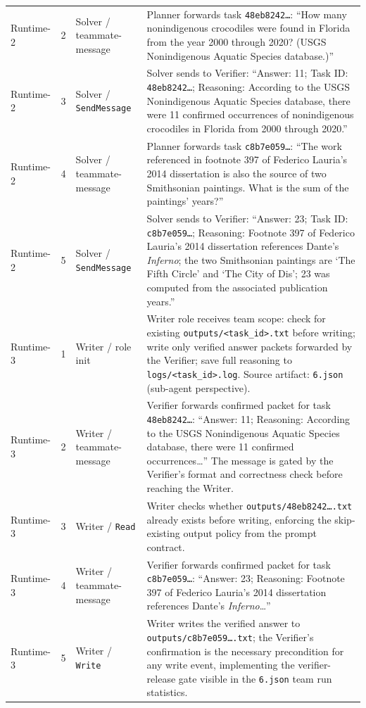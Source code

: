 \begin{table}[t]
\begin{tabular}{>{\raggedright\arraybackslash}p{}p{}p{}p{}}
        \mbox{Runtime-2} & 2 & Solver / teammate-message & Planner forwards task \texttt{48eb8242\ldots}: ``How many nonindigenous crocodiles were found in Florida from the year 2000 through 2020? (USGS Nonindigenous Aquatic Species database.)'' \\
        \mbox{Runtime-2} & 3 & Solver / \texttt{SendMessage} & Solver sends to Verifier: ``Answer: 11; Task ID: \texttt{48eb8242\ldots}; Reasoning: According to the USGS Nonindigenous Aquatic Species database, there were 11 confirmed occurrences of nonindigenous crocodiles in Florida from 2000 through 2020.'' \\
        \mbox{Runtime-2} & 4 & Solver / teammate-message & Planner forwards task \texttt{c8b7e059\ldots}: ``The work referenced in footnote 397 of Federico Lauria's 2014 dissertation is also the source of two Smithsonian paintings. What is the sum of the paintings' years?'' \\
        \mbox{Runtime-2} & 5 & Solver / \texttt{SendMessage} & Solver sends to Verifier: ``Answer: 23; Task ID: \texttt{c8b7e059\ldots}; Reasoning: Footnote 397 of Federico Lauria's 2014 dissertation references Dante's \emph{Inferno}; the two Smithsonian paintings are `The Fifth Circle' and `The City of Dis'; 23 was computed from the associated publication years.'' \\
        \midrule
        \mbox{Runtime-3} & 1 & Writer / role init & Writer role receives team scope: check for existing \texttt{outputs/<task\_id>.txt} before writing; write only verified answer packets forwarded by the Verifier; save full reasoning to \texttt{logs/<task\_id>.log}. Source artifact: \texttt{6.json} (sub-agent perspective). \\
        \mbox{Runtime-3} & 2 & Writer / teammate-message & Verifier forwards confirmed packet for task \texttt{48eb8242\ldots}: ``Answer: 11; Reasoning: According to the USGS Nonindigenous Aquatic Species database, there were 11 confirmed occurrences\ldots'' The message is gated by the Verifier's format and correctness check before reaching the Writer. \\
        \mbox{Runtime-3} & 3 & Writer / \texttt{Read} & Writer checks whether \texttt{outputs/48eb8242\ldots.txt} already exists before writing, enforcing the skip-existing output policy from the prompt contract. \\
        \mbox{Runtime-3} & 4 & Writer / teammate-message & Verifier forwards confirmed packet for task \texttt{c8b7e059\ldots}: ``Answer: 23; Reasoning: Footnote 397 of Federico Lauria's 2014 dissertation references Dante's \emph{Inferno}\ldots'' \\
        \mbox{Runtime-3} & 5 & Writer / \texttt{Write} & Writer writes the verified answer to \texttt{outputs/c8b7e059\ldots.txt}; the Verifier's confirmation is the necessary precondition for any write event, implementing the verifier-release gate visible in the \texttt{6.json} team run statistics. \\
        \bottomrule
    \end{tabular}
    \renewcommand{\arraystretch}{1.0}
\end{table}

